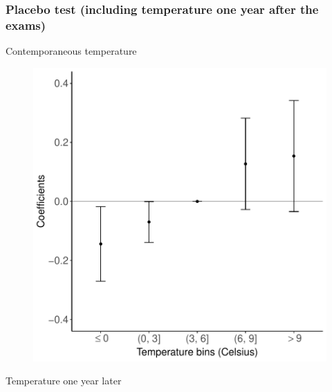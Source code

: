 \documentclass[10pt, pdfmx,hiresbb]{beamer}
\begin{document}
\begin{frame}\frametitle{Placebo test (including temperature one year after the exams)}
  \begin{minipage}{0.49\textwidth}
    \begin{center}
      Contemporaneous temperature
    \end{center}
    \begin{figure}[h]
      \centering
      \includegraphics[width = \textwidth]{../Output/images/reg_placebo_exam_4.pdf}
    \end{figure}
  \end{minipage}
  \begin{minipage}{0.49\textwidth}
    \begin{center}
      Temperature one year later
    \end{center}
    \begin{figure}[h]

\end{figure}
\end{minipage}
\end{frame}
\end{document}
